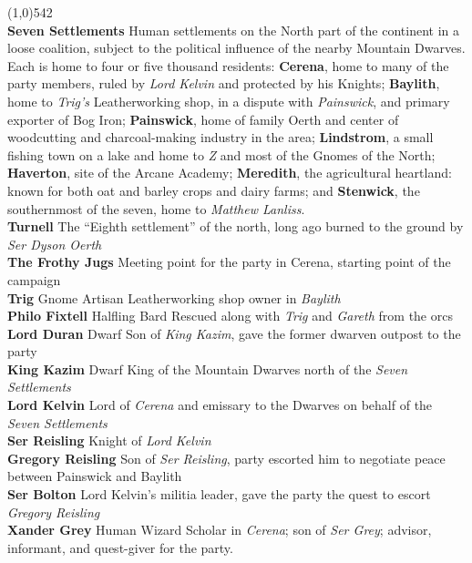 \documentclass[letterpaper]{article}
\newcommand{\fullline}{\noindent\line(1,0){542} \\}
\newcommand{\person}[3]{\noindent\textbf{#1
    \ifstrequal{#2}{M}{{\color{ProcessBlue}\male}}{%
    \ifstrequal{#2}{F}{\color{VioletRed}\female}{}}}{\scriptsize #3}}
\begin{document}
 \par
\vspace{-0.75em}
\fullline
\textbf{Seven Settlements} Human settlements on the North part of the continent in a loose coalition, subject to the political influence of the nearby Mountain Dwarves. Each is home to four or five thousand residents: \textbf{Cerena}, home to many of the party members, ruled by \emph{Lord Kelvin} and protected by his Knights; \textbf{Baylith}, home to \emph{Trig's} Leatherworking shop, in a dispute with \emph{Painswick}, and primary exporter of Bog Iron; \textbf{Painswick}, home of family Oerth and center of woodcutting and charcoal-making industry in the area; \textbf{Lindstrom}, a small fishing town on a lake and home to \emph{Z} and most of the Gnomes of the North; \textbf{Haverton}, site of the Arcane Academy; \textbf{Meredith}, the agricultural heartland: known for both oat and barley crops and dairy farms; and \textbf{Stenwick}, the southernmost of the seven, home to \emph{Matthew Lanliss}.\\
\textbf{Turnell} The ``Eighth settlement'' of the north, long ago burned to the ground by \emph{Ser Dyson Oerth} \\
\textbf{The Frothy Jugs} Meeting point for the party in Cerena, starting point of the campaign\\
\person{Trig}{F}{Gnome Artisan} Leatherworking shop owner in \emph{Baylith} \\
\person{Philo Fixtell}{M}{Halfling Bard} Rescued along with \emph{Trig} and \emph{Gareth} from the orcs \\
\person{Lord Duran}{M}{Dwarf} Son of \emph{King Kazim}, gave the former dwarven outpost to the party \\
\person{King Kazim}{M}{Dwarf} King of the Mountain Dwarves north of the \emph{Seven Settlements} \\
\person{Lord Kelvin}{M}{} Lord of \emph{Cerena} and emissary to the Dwarves on behalf of the \emph{Seven Settlements} \\
\person{Ser Reisling}{M}{} Knight of \emph{Lord Kelvin} \\
\person{Gregory Reisling}{M}{} Son of \emph{Ser Reisling}, party escorted him to negotiate peace between Painswick and Baylith \\
\person{Ser Bolton}{M}{} Lord Kelvin's militia leader, gave the party the quest to escort \emph{Gregory Reisling} \\
\person{Xander Grey}{M}{Human Wizard} Scholar in \emph{Cerena}; son of \emph{Ser Grey}; advisor, informant, and quest-giver for the party.\\
\end{document}
